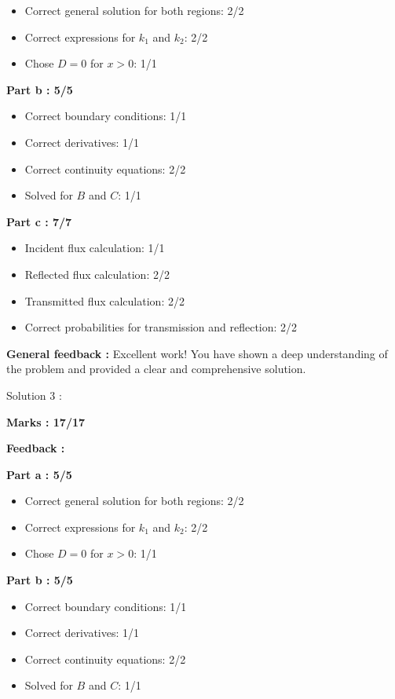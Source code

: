 \documentclass[a4paper,11pt]{article}
\begin{document}
\begin{itemize}
    \item Correct general solution for both regions: 2/2
    \item Correct expressions for $k_1$ and $k_2$: 2/2
    \item Chose $D = 0$ for $x > 0$: 1/1
\end{itemize}

\textbf{Part b : 5/5}

\begin{itemize}
    \item Correct boundary conditions:  1/1
    \item Correct derivatives: 1/1
    \item Correct continuity equations: 2/2
    \item Solved for $B$ and $C$: 1/1
\end{itemize}

\textbf{Part c : 7/7}

\begin{itemize}
    \item Incident flux calculation: 1/1
    \item Reflected flux calculation: 2/2
    \item Transmitted flux calculation: 2/2
    \item Correct probabilities for transmission and reflection: 2/2
\end{itemize}

\textbf{General feedback :}
Excellent work! You have shown a deep understanding of the problem and provided a clear and comprehensive solution.


Solution 3 :

\textbf{Marks : 17/17}

\textbf{Feedback :}

\textbf{Part a : 5/5}

\begin{itemize}
    \item Correct general solution for both regions: 2/2
    \item Correct expressions for $k_1$ and $k_2$: 2/2
    \item Chose $D = 0$ for $x > 0$: 1/1
\end{itemize}

\textbf{Part b : 5/5}

\begin{itemize}
    \item Correct boundary conditions:  1/1
    \item Correct derivatives: 1/1
    \item Correct continuity equations: 2/2
    \item Solved for $B$ and $C$: 1/1
\end{itemize}
\end{document}
